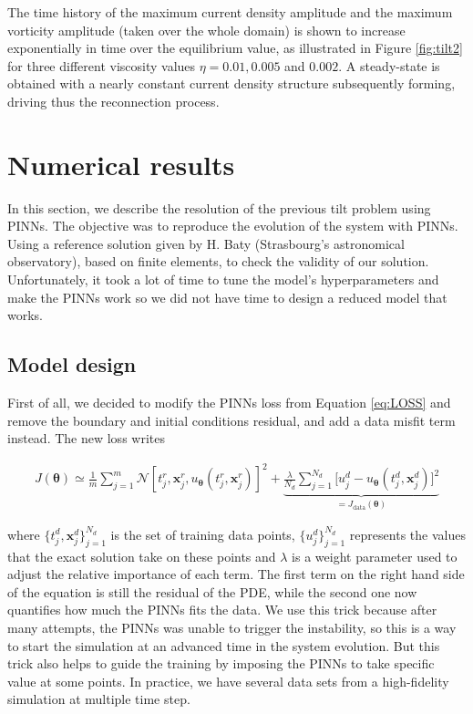 \documentclass[12pt,openany]{amsbook}
\newcommand{\bbm}[1]{{\mathbf{#1}}}
\begin{document}
The time history of the maximum current density amplitude and the maximum vorticity amplitude (taken over the whole domain)
is shown to increase exponentially in time over the equilibrium value, as illustrated in Figure \ref{fig:tilt2} for three different
viscosity values $\eta = 0.01, 0.005$ and $0.002$. A steady-state is obtained with a nearly constant 
current density structure subsequently forming, driving thus the reconnection process.

\clearpage
\section{Numerical results}

In this section, we describe the resolution of the previous tilt problem using PINNs. 
The objective was to reproduce the evolution of the system with PINNs. Using a reference solution given by 
H. Baty (Strasbourg's astronomical observatory), based on finite elements, to check the validity of our solution. 
Unfortunately, it took a lot of time to tune the model's hyperparameters and make the PINNs work so we 
did not have time to design a reduced model that works.
\subsection{Model design}

First of all, we decided to modify the PINNs loss from Equation \ref{eq:LOSS} and remove the 
boundary and initial conditions residual, and add a data misfit term instead. The new loss writes

\begin{align}
    J(\bm \theta) \simeq  \frac{1}{m} \sum_{j=1}^{m} \mathcal{N}[t_j^r,\bbm x_j^r, u_{\bm \theta}(t_j^r,\bbm x_j^r)]^2
    + \underbrace{\frac{\lambda}{N_d} \sum_{j=1}^{N_d} \Big[ u_j^d  - u_{\bm \theta}(t_j^d, \bbm x_j^d) \Big]^2}_{ = J_{\text{data}}(\bm \theta)}
    \label{eq:LOSSMHD}
\end{align}

where $\{t_j^d, \bbm x_j^d \}_{j=1}^{N_d}$ is the set of training data points, $\{u_j^d\}_{j=1}^{N_d}$ represents the values that
the exact solution take on these points and $\lambda$ is a weight parameter used to adjust the relative importance of each term.
The first term on the right hand side of the equation is still the residual of the PDE, while the second one now quantifies
how much the PINNs fits the data. We use this trick because after many attempts, the PINNs was unable to trigger the instability, so 
this is a way to start the simulation at an advanced time in the system evolution. But this trick also helps to guide the training
by imposing the PINNs to take specific value at some points.
In practice, we have several data sets from a high-fidelity simulation at multiple time step.\\
\end{document}
